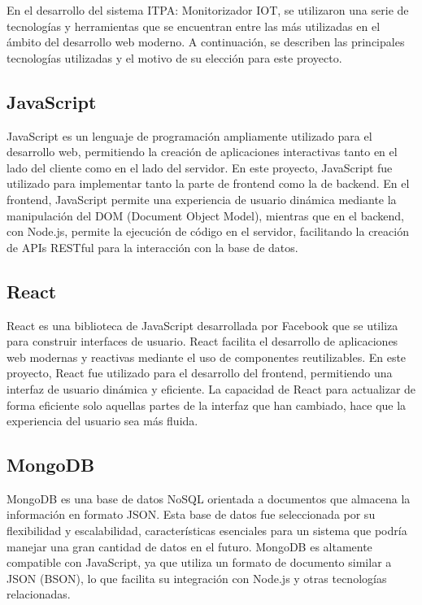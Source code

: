 
En el desarrollo del sistema ITPA: Monitorizador IOT, se utilizaron una serie de tecnologías y herramientas que se encuentran entre las más utilizadas en el ámbito del desarrollo web moderno. A continuación, se describen las principales tecnologías utilizadas y el motivo de su elección para este proyecto.

\subsection{JavaScript}
JavaScript es un lenguaje de programación ampliamente utilizado para el desarrollo web, permitiendo la creación de aplicaciones interactivas tanto en el lado del cliente como en el lado del servidor. En este proyecto, JavaScript fue utilizado para implementar tanto la parte de frontend como la de backend. En el frontend, JavaScript permite una experiencia de usuario dinámica mediante la manipulación del DOM (Document Object Model), mientras que en el backend, con Node.js, permite la ejecución de código en el servidor, facilitando la creación de APIs RESTful para la interacción con la base de datos.

\subsection{React}
React es una biblioteca de JavaScript desarrollada por Facebook que se utiliza para construir interfaces de usuario. React facilita el desarrollo de aplicaciones web modernas y reactivas mediante el uso de componentes reutilizables. En este proyecto, React fue utilizado para el desarrollo del frontend, permitiendo una interfaz de usuario dinámica y eficiente. La capacidad de React para actualizar de forma eficiente solo aquellas partes de la interfaz que han cambiado, hace que la experiencia del usuario sea más fluida.

\subsection{MongoDB}
MongoDB es una base de datos NoSQL orientada a documentos que almacena la información en formato JSON. Esta base de datos fue seleccionada por su flexibilidad y escalabilidad, características esenciales para un sistema que podría manejar una gran cantidad de datos en el futuro. MongoDB es altamente compatible con JavaScript, ya que utiliza un formato de documento similar a JSON (BSON), lo que facilita su integración con Node.js y otras tecnologías relacionadas.

